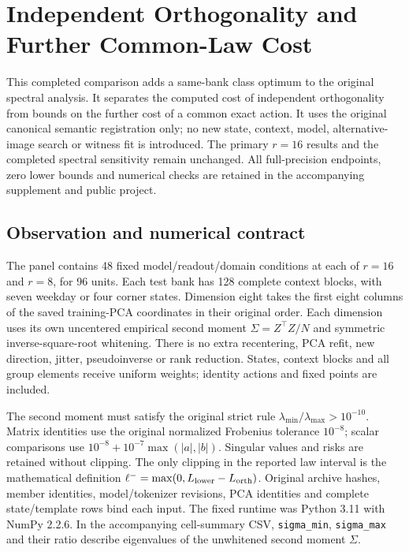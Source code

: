 \section{Independent Orthogonality and Further Common-Law Cost}
\label{app:orthogonal-results}
This completed comparison adds a same-bank class optimum to the original spectral analysis. It separates the computed cost of independent orthogonality from bounds on the further cost of a common exact action. It uses the original canonical semantic registration only; no new state, context, model, alternative-image search or witness fit is introduced. The primary $r=16$ results and the completed spectral sensitivity remain unchanged. All full-precision endpoints, zero lower bounds and numerical checks are retained in the accompanying supplement and public project.

\subsection{Observation and numerical contract}
The panel contains 48 fixed model/readout/domain conditions at each of $r=16$ and $r=8$, for 96 units. Each test bank has 128 complete context blocks, with seven weekday or four corner states. Dimension eight takes the first eight columns of the saved training-PCA coordinates in their original order. Each dimension uses its own uncentered empirical second moment $\Sigma=Z^\top Z/N$ and symmetric inverse-square-root whitening. There is no extra recentering, PCA refit, new direction, jitter, pseudoinverse or rank reduction. States, context blocks and all group elements receive uniform weights; identity actions and fixed points are included.

The second moment must satisfy the original strict rule $\lambda_{\min}/\lambda_{\max}>10^{-10}$. Matrix identities use the original normalized Frobenius tolerance $10^{-8}$; scalar comparisons use $10^{-8}+10^{-7}\max(|a|,|b|)$. Singular values and risks are retained without clipping. The only clipping in the reported law interval is the mathematical definition $\ell^-=\max(0,L_{\rm lower}-L_{\rm orth})$. Original archive hashes, member identities, model/tokenizer revisions, PCA identities and complete state/template rows bind each input. The fixed runtime was Python 3.11 with NumPy 2.2.6. In the accompanying cell-summary CSV, \texttt{sigma\_min}, \texttt{sigma\_max} and their ratio describe eigenvalues of the unwhitened second moment $\Sigma$.

